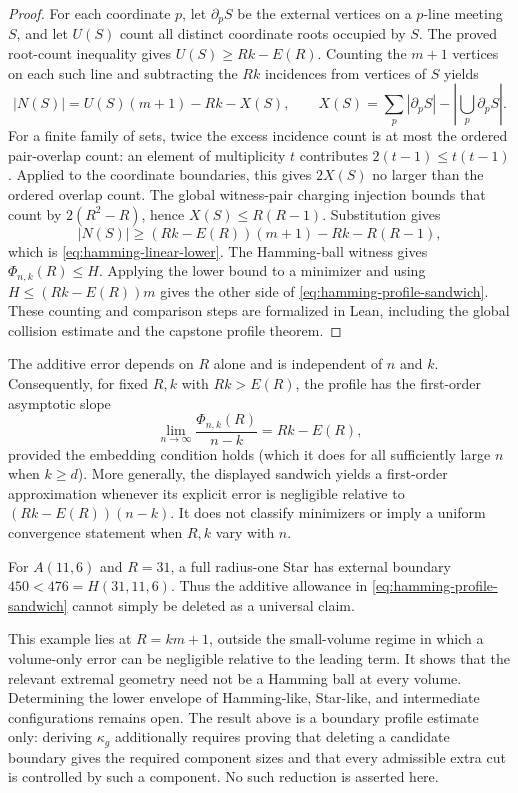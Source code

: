 \begin{proof}
For each coordinate $p$, let $\partial_pS$ be the external vertices on a
$p$-line meeting $S$, and let $U(S)$ count all distinct coordinate roots
occupied by $S$. The proved root-count inequality gives
$U(S)\geq Rk-E(R)$. Counting the $m+1$ vertices on each such line and
subtracting the $Rk$ incidences from vertices of $S$ yields
\[
 |N(S)|=U(S)(m+1)-Rk-X(S),\qquad
 X(S)=\sum_p|\partial_pS|-\left|\bigcup_p\partial_pS\right|.
\]
For a finite family of sets, twice the excess incidence count is at most the
ordered pair-overlap count: an element of multiplicity $t$ contributes
$2(t-1)\leq t(t-1)$. Applied to the coordinate boundaries, this gives
$2X(S)$ no larger than the ordered overlap count. The global witness-pair
charging injection bounds that count by $2(R^2-R)$, hence
$X(S)\leq R(R-1)$. Substitution gives
\[
 |N(S)|\geq(Rk-E(R))(m+1)-Rk-R(R-1),
\]
which is \eqref{eq:hamming-linear-lower}. The Hamming-ball witness gives
$\Phi_{n,k}(R)\leq H$. Applying the lower bound to a minimizer and using
$H\leq(Rk-E(R))m$ gives the other side of
\eqref{eq:hamming-profile-sandwich}. These counting and comparison steps are
formalized in Lean, including the global collision estimate and the capstone
profile theorem.
\end{proof}

The additive error depends on $R$ alone and is independent of $n$ and $k$.
Consequently, for fixed $R,k$ with $Rk>E(R)$, the profile has the first-order
asymptotic slope
\[
 \lim_{n\to\infty}\frac{\Phi_{n,k}(R)}{n-k}=Rk-E(R),
\]
provided the embedding condition holds (which it does for all sufficiently
large $n$ when $k\geq d$). More generally, the displayed sandwich yields a
first-order approximation whenever its explicit error is negligible relative
to $(Rk-E(R))(n-k)$. It does not classify minimizers or imply a uniform
convergence statement when $R,k$ vary with $n$.

\begin{proposition}\label{prop:hamming-sandwich-sharp}
For $A(11,6)$ and $R=31$, a full radius-one Star has external boundary
$450<476=H(31,11,6)$. Thus the additive allowance in
\eqref{eq:hamming-profile-sandwich} cannot simply be deleted as a universal
claim.
\end{proposition}

This example lies at $R=km+1$, outside the small-volume regime in which a
volume-only error can be negligible relative to the leading term. It shows
that the relevant extremal geometry need not be a Hamming ball at every
volume. Determining the lower envelope of Hamming-like, Star-like, and
intermediate configurations remains open. The result above is a boundary
profile estimate only: deriving $\kappa_g$ additionally requires proving
that deleting a candidate boundary gives the required component sizes and
that every admissible extra cut is controlled by such a component. No such
reduction is asserted here.
